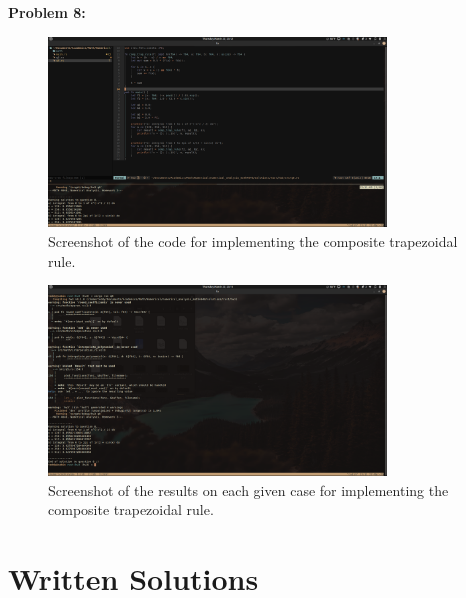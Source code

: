 \documentclass[12pt, letterpaper]{article}
\theoremstyle{nonumberplain}
\begin{document}
\hspace{18pt}\textbf{Problem 8:} \medskip

\begin{figure}[!htbp]
	\centering
	\includegraphics[width=0.8\textwidth]{numhw3-q8-code.png}
	\caption{Screenshot of the code for implementing the composite trapezoidal rule.}
\end{figure}

\begin{figure}[!htbp]
	\centering
	\includegraphics[width=0.8\textwidth]{numhw3-q8-1.png}
	\caption{Screenshot of the results on each given case for implementing the composite trapezoidal rule.}
\end{figure}

\clearpage

\section{Written Solutions}

\end{document}
